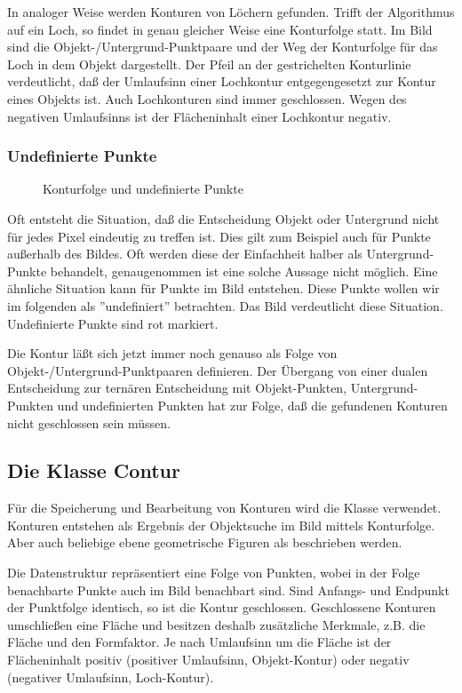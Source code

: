 In analoger Weise werden Konturen von Löchern gefunden. Trifft der Algorithmus
auf ein Loch, so findet in genau gleicher Weise eine Konturfolge statt. Im
Bild sind die Objekt-/Untergrund-Punktpaare und der Weg der
Konturfolge für das Loch in dem Objekt dargestellt. Der Pfeil an der
gestrichelten Konturlinie verdeutlicht, daß der Umlaufsinn einer Lochkontur
entgegengesetzt zur Kontur eines Objekts ist. Auch Lochkonturen sind immer
geschlossen. Wegen des negativen Umlaufsinns ist der Flächeninhalt einer
Lochkontur negativ.

\subsubsection{Undefinierte Punkte}
\label{UndefiniertePunkte}

\begin{figure}[h]
  \label{fig:hole}
  \caption{Konturfolge und undefinierte Punkte}
\end{figure}

Oft entsteht die Situation, daß die Entscheidung Objekt oder Untergrund nicht
für jedes Pixel eindeutig zu treffen ist. Dies gilt zum Beispiel auch für
Punkte außerhalb des Bildes. Oft werden diese der Einfachheit halber als
Untergrund-Punkte behandelt, genaugenommen ist eine solche Aussage nicht
möglich. Eine ähnliche Situation kann für Punkte im Bild entstehen. Diese
Punkte wollen wir im folgenden als ''undefiniert'' betrachten. Das Bild 
verdeutlicht diese Situation. Undefinierte Punkte sind rot markiert.

Die Kontur läßt sich jetzt immer noch genauso als Folge von
Objekt-/Untergrund-Punktpaaren definieren. Der Übergang von einer dualen 
Entscheidung zur ternären Entscheidung mit Objekt-Punkten, Untergrund-Punkten
und undefinierten Punkten hat zur Folge, daß die gefundenen Konturen nicht 
geschlossen sein müssen.

\subsection{Die Klasse Contur}
\hypertarget{Contur}{}

Für die Speicherung und Bearbeitung von Konturen wird die Klasse 
verwendet. Konturen entstehen als Ergebnis der Objektsuche im Bild 
mittels Konturfolge. Aber auch beliebige ebene geometrische 
Figuren als  beschrieben werden. 

Die Datenstruktur  repräsentiert eine Folge von Punkten, wobei 
in der Folge benachbarte Punkte auch im Bild benachbart sind. Sind Anfangs-
und Endpunkt der Punktfolge identisch, so ist die Kontur
geschlossen. Geschlossene Konturen umschließen eine Fläche und besitzen
deshalb zusätzliche Merkmale, z.B. die Fläche und den Formfaktor. Je nach
Umlaufsinn um die Fläche ist der Flächeninhalt positiv (positiver Umlaufsinn,
Objekt-Kontur) oder negativ (negativer Umlaufsinn, Loch-Kontur).

